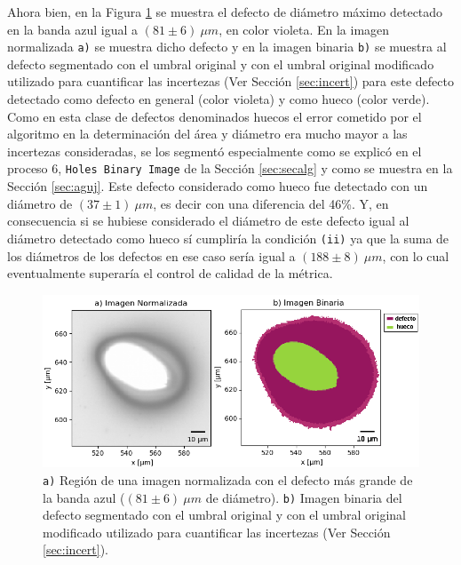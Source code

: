  Ahora bien, en la Figura \ref{fig:deffd} se muestra el defecto de diámetro máximo detectado en la banda azul igual a $(81 \pm 6)~ \mu m$, en color violeta. En la imagen normalizada \texttt{a)} se muestra dicho defecto y en la imagen binaria \texttt{b)} se muestra al defecto segmentado con el umbral original y con el umbral original modificado utilizado para cuantificar las incertezas (Ver Sección \ref{sec:incert}) para este defecto detectado como defecto en general (color violeta) y como hueco (color verde). Como en esta clase de defectos denominados huecos el error cometido por el algoritmo en la determinación del área y diámetro era mucho mayor a las incertezas consideradas, se los segmentó especialmente como se explicó en el proceso 6, \texttt{Holes Binary Image} de la Sección \ref{sec:secalg} y como se muestra en la Sección \ref{sec:aguj}. Este defecto considerado como hueco fue detectado con un diámetro de $(37 \pm 1)~\mu m$, es decir con una diferencia del 46\%. Y, en consecuencia si se hubiese considerado el diámetro de este defecto igual al diámetro detectado como hueco sí cumpliría la condición \texttt{(ii)} ya que la suma de los diámetros de los defectos en ese caso sería igual a $(188 \pm 8)~ \mu m$, con lo cual eventualmente superaría el control de calidad de la métrica. 
 
 \begin{figure}[H]
\centering
\includegraphics[scale=1.0]{Figs/cuantificaciondefectos/agujdefectocompar.png}
	\caption{\texttt{a)} Región de una imagen normalizada con el defecto más grande de la banda azul ($(81 \pm 6)~ \mu m$ de diámetro). \texttt{b)} Imagen binaria del defecto segmentado con el umbral original y con el umbral original modificado utilizado para cuantificar las incertezas (Ver Sección \ref{sec:incert}). }
\label{fig:deffd}
\end{figure}
 
